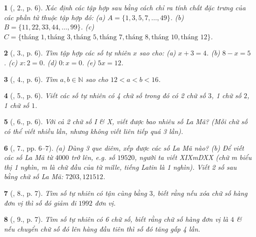 \documentclass{article}
\newtheorem{baitoan}{}
\begin{document}
\begin{baitoan}[\cite{Binh_Toan_6_tap_1}, 2., p. 6]
	Xác định các tập hợp sau bằng cách chỉ ra tính chất đặc trưng của các phần tử thuộc tập hợp đó: (a) $A = \{1,3,5,7,\ldots,49\}$. (b) $B = \{11,22,33,44,\ldots,99\}$. (c) $C = \{\mbox{tháng } 1,\mbox{tháng } 3,\mbox{tháng } 5,\mbox{tháng } 7,\mbox{tháng } 8,\mbox{tháng } 10,\mbox{tháng } 12\}$.
\end{baitoan}

\begin{baitoan}[\cite{Binh_Toan_6_tap_1}, 3., p. 6]
	Tìm tập hợp các số tự nhiên $x$ sao cho: (a) $x + 3 = 4$. (b) $8 - x = 5$. (c) $x:2 = 0$. (d) $0:x = 0$. (e) $5x = 12$.
\end{baitoan}

\begin{baitoan}[\cite{Binh_Toan_6_tap_1}, 4., p. 6]
	Tìm $a,b\in\mathbb{N}$ sao cho $12 < a < b < 16$.
\end{baitoan}

\begin{baitoan}[\cite{Binh_Toan_6_tap_1}, 5., p. 6]
	Viết các số tự nhiên có 4 chữ số trong đó có 2 chữ số $3$, 1 chữ số $2$, 1 chữ số $1$.
\end{baitoan}

\begin{baitoan}[\cite{Binh_Toan_6_tap_1}, 6., p. 6]
	Với cả 2 chữ số I \& X, viết được bao nhiêu số La Mã? (Mỗi chữ số có thể viết nhiều lần, nhưng không viết liên tiếp quá 3 lần).
\end{baitoan}

\begin{baitoan}[\cite{Binh_Toan_6_tap_1}, 7., pp. 6--7]
	(a) Dùng 3 que diêm, xếp được các số La Mã nào? (b) Để viết các số La Mã từ $4000$ trở lên, e.g. số $19520$, người ta viết XIXmDXX (chữ m biểu thị \emph{1 nghìn}, m là chữ đầu của từ \emph{mille}, tiếng Latin là 1 nghìn). Viết 2 số sau bằng chữ số La Mã: $7203, 121512$.
\end{baitoan}

\begin{baitoan}[\cite{Binh_Toan_6_tap_1}, 8., p. 7]
	Tìm số tự nhiên có tận cùng bằng $3$, biết rằng nếu xóa chữ số hàng đơn vị thì số đó giảm đi $1992$ đơn vị.
\end{baitoan}

\begin{baitoan}[\cite{Binh_Toan_6_tap_1}, 9., p. 7]
	Tìm số tự nhiên có 6 chữ số, biết rằng chữ số hàng đơn vị là $4$ \& nếu chuyển chữ số đó lên hàng đầu tiên thì số đó tăng gấp 4 lần.
\end{baitoan}
\end{document}
